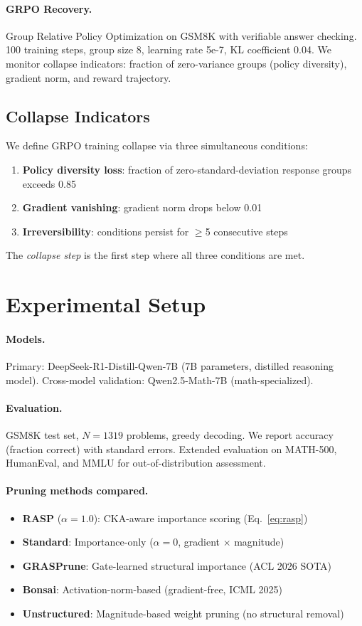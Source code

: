 \documentclass[11pt,a4paper]{article}
\begin{document}
\paragraph{GRPO Recovery.} Group Relative Policy Optimization on GSM8K with verifiable answer checking. 100 training steps, group size 8, learning rate 5e-7, KL coefficient 0.04. We monitor collapse indicators: fraction of zero-variance groups (policy diversity), gradient norm, and reward trajectory.

\subsection{Collapse Indicators}

We define GRPO training collapse via three simultaneous conditions:
\begin{enumerate}
\item \textbf{Policy diversity loss}: fraction of zero-standard-deviation response groups exceeds 0.85
\item \textbf{Gradient vanishing}: gradient norm drops below 0.01
\item \textbf{Irreversibility}: conditions persist for $\geq$5 consecutive steps
\end{enumerate}
The \emph{collapse step} is the first step where all three conditions are met.

\section{Experimental Setup}

\paragraph{Models.} Primary: DeepSeek-R1-Distill-Qwen-7B (7B parameters, distilled reasoning model). Cross-model validation: Qwen2.5-Math-7B (math-specialized).

\paragraph{Evaluation.} GSM8K test set, $N=1319$ problems, greedy decoding. We report accuracy (fraction correct) with standard errors. Extended evaluation on MATH-500, HumanEval, and MMLU for out-of-distribution assessment.

\paragraph{Pruning methods compared.}
\begin{itemize}
\item \textbf{RASP} ($\alpha=1.0$): CKA-aware importance scoring (Eq.~\ref{eq:rasp})
\item \textbf{Standard}: Importance-only ($\alpha=0$, gradient $\times$ magnitude)
\item \textbf{GRASPrune}: Gate-learned structural importance (ACL 2026 SOTA)
\item \textbf{Bonsai}: Activation-norm-based (gradient-free, ICML 2025)
\item \textbf{Unstructured}: Magnitude-based weight pruning (no structural removal)
\end{itemize}
\end{document}
